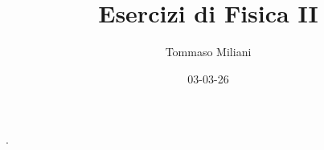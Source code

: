 \documentclass[a4paper, oneside]{article}
\title{Esercizi di Fisica II}
\author{Tommaso Miliani}
\date{03-03-26}
\begin{document}
                {}          %
                {}          %
                {\slshape}  %
                {}          %
                {\bfseries} %
                {.}         %
                {\newline}  %
                {}          %
\theoremstyle{theoremEnv}

\newtheorem{definition}{Definizione}[section]
\newtheorem{theorem}{Teorema}[section]
\newtheorem{lemma}{Proposizione}[section]
\newtheorem{observation}{Osservazione}[section]
\newtheorem{corollary}{Corollario}[theorem]
\newtheorem{example}{Esempio}[section]
\newtheorem{remark}{Enunciato}[section]

\maketitle
\end{document}
